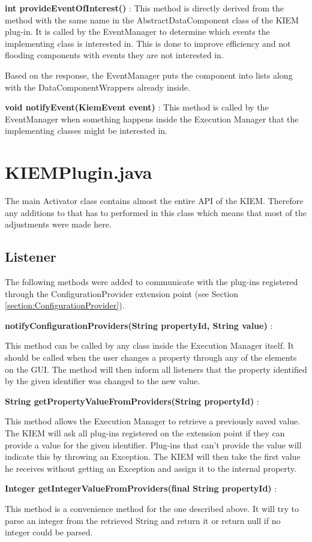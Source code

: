\begin{description}
 \item \textbf{int provideEventOfInterest()} : This method is directly derived from the method with 
the same name in the AbstractDataComponent class of the \ac{KIEM} plug-in. It is called by the
EventManager to determine which events the implementing class is interested in.
This is done to improve efficiency and not flooding components with events they are not interested in.

Based on the response, the EventManager puts the component into lists along with the DataComponentWrappers
already inside.
 \item \textbf{void notifyEvent(KiemEvent event)} : This method is called by the EventManager when 
something happens inside the Execution Manager that the implementing classes might be interested in.
\end{description}

\section{KIEMPlugin.java}
\label{section:ConfChangesKiemPlugin}
The main Activator class contains almost the entire \ac{API} of the \ac{KIEM}.
Therefore any additions to that has to performed in this class which means that
most of the adjustments were made here.

\subsection{Listener}
The following methods were added to communicate with the plug-ins registered through
the ConfigurationProvider extension point (see Section \ref{section:ConfigurationProvider}).
\begin{description}
 \item \textbf{notifyConfigurationProviders(String propertyId, String value)} : 

This method can be called by any class
inside the Execution Manager itself. It should be called when the user changes a property through any of
the elements on the \ac{GUI}. The method will then inform all listeners that the property identified by the
given identifier was changed to the new value.
 \item \textbf{String getPropertyValueFromProviders(String propertyId)} : 

This method allows the Execution Manager to
retrieve a previously saved value. The \ac{KIEM} will ask all plug-ins registered on the extension point if they
can provide a value for the given identifier. Plug-ins that can't provide the value will indicate this by throwing
an Exception. The \ac{KIEM} will then take the first value he receives without getting an Exception and assign it
to the internal property.
 \item \textbf{Integer getIntegerValueFromProviders(final String propertyId)} : 

This method is a convenience method for
the one described above. It will try to parse an integer from the retrieved String and return it or return null
if no integer could be parsed.
\end{description}

